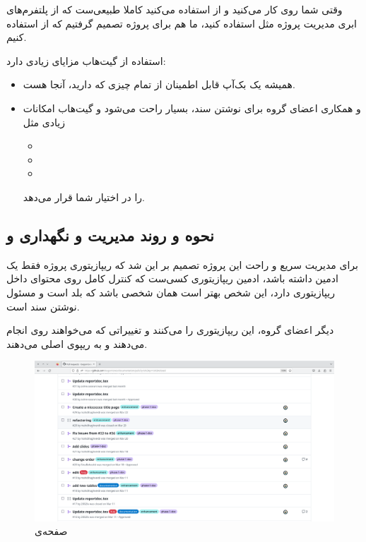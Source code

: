 وقتی شما روی  کار می‌کنید و از  استفاده می‌کنید کاملا طبیعی‌ست که از پلتفرم‌های ابری مدیریت پروژه مثل  استفاده کنید، ما هم برای پروژه تصمیم گرفتیم که از  استفاده کنیم.

استفاده از گیت‌هاب مزایای زیادی دارد:
\begin{itemize}
	\item 
	همیشه یک بک‌آپ قابل اطمینان از تمام چیزی که دارید، آنجا هست.
	
	\item 
	و همکاری اعضای گروه برای نوشتن سند، بسیار راحت می‌شود و گیت‌هاب امکانات زیادی مثل 
	\begin{itemize}
		\item {}
		\item {}
		\item {}
	\end{itemize}
را در اختیار شما قرار می‌دهد.
\end{itemize}

\subsection{نحوه و روند مدیریت و نگهداری و }
برای مدیریت سریع و راحت این پروژه تصمیم بر این شد که ریپازیتوری پروژه فقط یک ادمین داشته باشد، ادمین ریپازیتوری کسی‌ست که کنترل کامل روی محتوای داخل ریپازیتوری دارد، این شخص بهتر است همان شخصی باشد که \lr{\LaTeX } بلد است و مسئول نوشتن سند است.

دیگر اعضای گروه، این ریپازیتوری را  می‌کنند و تغییراتی که می‌خواهند روی  انجام می‌دهند و به ریپو‌ی اصلی  می‌دهند.

\begin{figure}[H]
	\caption{صفحه‌ی }
\begin{center}
	\includegraphics[angle=90, width=\textwidth, height=\textheight]{./images/prs}
\end{center}
\end{figure}


